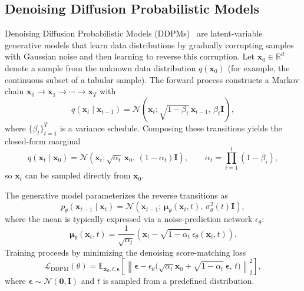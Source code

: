 \documentclass[times, review, 10pt]{elsarticle}
\begin{document}
\subsection{Denoising Diffusion Probabilistic Models}
\label{sec:background:ddpm}

Denoising Diffusion Probabilistic Models (DDPMs)~\citep{ddpm} are latent-variable generative models that learn data distributions by gradually corrupting samples with Gaussian noise and then learning to reverse this corruption. Let $\mathbf{x}_0 \in \mathbb{R}^d$ denote a sample from the unknown data distribution $q(\mathbf{x}_0)$ (for example, the continuous subset of a tabular sample). The forward process constructs a Markov chain $\mathbf{x}_0 \rightarrow \mathbf{x}_1 \rightarrow \cdots \rightarrow \mathbf{x}_T$ with
\[
q(\mathbf{x}_t \mid \mathbf{x}_{t-1})
= \mathcal{N}\!\left(
\mathbf{x}_t;\sqrt{1-\beta_t}\,\mathbf{x}_{t-1},\,\beta_t \mathbf{I}
\right),
\]
where $\{\beta_t\}_{t=1}^T$ is a variance schedule. Composing these transitions yields the closed-form marginal
\begin{equation}
q(\mathbf{x}_t \mid \mathbf{x}_0)
= \mathcal{N}\!\left(
\mathbf{x}_t;\sqrt{\alpha_t}\,\mathbf{x}_0,\,(1-\alpha_t)\mathbf{I}
\right),
\qquad
\alpha_t = \prod_{i=1}^t (1-\beta_i),
\label{eq:ddpm-marginal}
\end{equation}
so $\mathbf{x}_t$ can be sampled directly from $\mathbf{x}_0$.

The generative model parameterizes the reverse transitions as
\begin{equation}
p_\theta(\mathbf{x}_{t-1} \mid \mathbf{x}_t)
= \mathcal{N}\!\left(
\mathbf{x}_{t-1};
\,\boldsymbol{\mu}_\theta(\mathbf{x}_t, t),\,
\sigma_\theta^2(t)\mathbf{I}
\right),
\label{eq:ddpm-reverse}
\end{equation}
where the mean is typically expressed via a noise-prediction network $\epsilon_\theta$:
\begin{equation}
\boldsymbol{\mu}_\theta(\mathbf{x}_t, t)
= \frac{1}{\sqrt{\alpha_t}}
\left(
\mathbf{x}_t - \sqrt{1-\alpha_t}\,\epsilon_\theta(\mathbf{x}_t, t)
\right).
\label{eq:ddpm-mu}
\end{equation}
Training proceeds by minimizing the denoising score-matching loss
\begin{equation}
\mathcal{L}_{\text{DDPM}}(\theta)
= \mathbb{E}_{\mathbf{x}_0,t,\boldsymbol{\epsilon}}
\left[
\left\|
\boldsymbol{\epsilon}
- \epsilon_\theta\big(\sqrt{\alpha_t}\mathbf{x}_0
+ \sqrt{1-\alpha_t}\,\boldsymbol{\epsilon},\, t\big)
\right\|_2^2
\right],
\label{eq:ddpm-loss}
\end{equation}
where $\boldsymbol{\epsilon} \sim \mathcal{N}(\mathbf{0},\mathbf{I})$ and $t$ is sampled from a predefined distribution.
\end{document}
